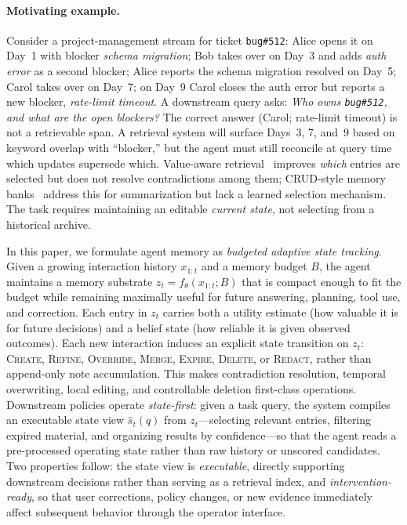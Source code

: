 \paragraph{Motivating example.}
Consider a project-management stream for ticket \texttt{bug\#512}: Alice opens it on Day~1 with blocker \emph{schema migration}; Bob takes over on Day~3 and adds \emph{auth error} as a second blocker; Alice reports the schema migration resolved on Day~5; Carol takes over on Day~7; on Day~9 Carol closes the auth error but reports a new blocker, \emph{rate-limit timeout}. A downstream query asks: \emph{Who owns \texttt{bug\#512}, and what are the open blockers?}
The correct answer (Carol; rate-limit timeout) is not a retrievable span. A retrieval system will surface Days~3, 7, and~9 based on keyword overlap with ``blocker,'' but the agent must still reconcile at query time which updates supersede which. Value-aware retrieval~\citep{zhang2026memrl} improves \emph{which} entries are selected but does not resolve contradictions among them; CRUD-style memory banks~\citep{zhang2026uma} address this for summarization but lack a learned selection mechanism. The task requires maintaining an editable \emph{current state}, not selecting from a historical archive.

In this paper, we formulate agent memory as \emph{budgeted adaptive state tracking}. Given a growing interaction history $x_{1:t}$ and a memory budget $B$, the agent maintains a memory substrate $z_t = f_{\theta}(x_{1:t}; B)$ that is compact enough to fit the budget while remaining maximally useful for future answering, planning, tool use, and correction. Each entry in $z_t$ carries both a utility estimate (how valuable it is for future decisions) and a belief state (how reliable it is given observed outcomes). Each new interaction induces an explicit state transition on $z_t$: \textsc{Create}, \textsc{Refine}, \textsc{Override}, \textsc{Merge}, \textsc{Expire}, \textsc{Delete}, or \textsc{Redact}, rather than append-only note accumulation. This makes contradiction resolution, temporal overwriting, local editing, and controllable deletion first-class operations. Downstream policies operate \emph{state-first}: given a task query, the system compiles an executable state view $\hat{s}_t(q)$ from $z_t$---selecting relevant entries, filtering expired material, and organizing results by confidence---so that the agent reads a pre-processed operating state rather than raw history or unscored candidates. Two properties follow: the state view is \emph{executable}, directly supporting downstream decisions rather than serving as a retrieval index, and \emph{intervention-ready}, so that user corrections, policy changes, or new evidence immediately affect subsequent behavior through the operator interface.

